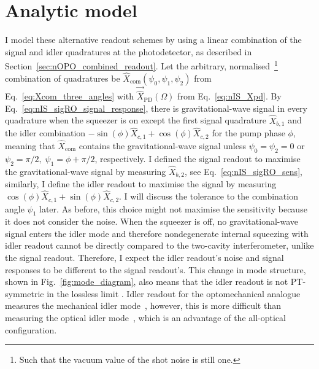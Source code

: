 \section{Analytic model}
\label{sec:nIS_idlerRO_model}

I model these alternative readout schemes by using a linear combination of the signal and idler quadratures at the photodetector, as described in Section~\ref{sec:nOPO_combined_readout}. Let the arbitrary, normalised~\footnote{Such that the vacuum value of the shot noise is still one.} combination of quadratures be $\hat{X}_\text{com}(\psi_0,\psi_1,\psi_2)$ from Eq.~\ref{eq:Xcom_three_angles} with $\vec{\hat X}_\text{PD}(\Omega)$ from Eq.~\ref{eq:nIS_Xpd}. By Eq.~\ref{eq:nIS_sigRO_signal_response}, there is gravitational-wave signal in every quadrature when the squeezer is on except the first signal quadrature $\hat{X}_{b,1}$ and the idler combination $-\sin(\phi)\hat{X}_{c,1}+\cos(\phi)\hat{X}_{c,2}$ for the pump phase $\phi$, meaning that $\hat{X}_\text{com}$ contains the gravitational-wave signal unless $\psi_0=\psi_2=0$ or $\psi_2=\pi/2,\;\psi_1=\phi+\pi/2$, respectively. I defined the signal readout to maximise the gravitational-wave signal by measuring $\hat{X}_{b,2}$, see Eq.~\ref{eq:nIS_sigRO_sens}, similarly, I define the idler readout to maximise the signal by measuring $\cos(\phi)\hat{X}_{c,1}+\sin(\phi)\hat{X}_{c,2}$. I will discuss the tolerance to the combination angle $\psi_1$ later. As before, this choice might not maximise the sensitivity because it does not consider the noise.
When the squeezer is off, no gravitational-wave signal enters the idler mode and therefore nondegenerate internal squeezing with idler readout cannot be directly compared to the two-cavity interferometer, unlike the signal readout. Therefore, I expect the idler readout's noise and signal responses to be different to the signal readout's.
This change in mode structure, shown in Fig.~\ref{fig:mode_diagram}, also means that the idler readout is not PT-symmetric in the lossless limit . Idler readout for the optomechanical analogue measures the mechanical idler mode~\cite{liEnhancingInterferometerSensitivity2021}, however, this is more difficult than measuring the optical idler mode~\cite{}, which is an advantage of the all-optical configuration.

